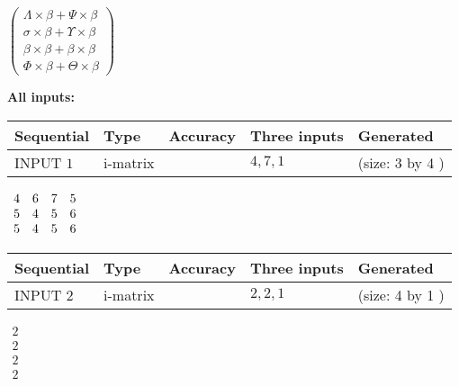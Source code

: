 \documentclass[12pt]{article}
\begin{document}
   
 $  \left( \begin{array}
 {
 c
 }
  \Lambda \times  \beta +  \Psi \times  \beta \\ 
  \sigma \times  \beta +  \Upsilon \times  \beta \\ 
  \beta \times  \beta +  \beta \times  \beta \\ 
  \Phi \times  \beta +  \Theta \times  \beta
 \end{array} \right) $ 
   
   
\noindent\vspace{0.1in}\hspace{-0.08in} {\textbf{\Large{All inputs: }}}
   
   
  
  
\noindent\begin{tabular}{|l|l|l|l|l|}
\hline
 Sequential & Type & Accuracy & Three inputs & Generated \\ 
\hline
 
 
  INPUT $            1 $ & i-matrix &  & $
 4
 , 
 7
 , 
 1
 $ & (size:            3  by            4 )
 \\  \hline  
 \end{tabular}
   
   
 $\begin{array}{
 c
 c
 c
 c
 }
           4  & 
           6  & 
           7  & 
           5  \\ 
           5  & 
           4  & 
           5  & 
           6  \\ 
           5  & 
           4  & 
           5  & 
           6
\end{array}  $ 
  
  
\noindent\begin{tabular}{|l|l|l|l|l|}
\hline
 Sequential & Type & Accuracy & Three inputs & Generated \\ 
\hline
 
 
  INPUT $            2 $ & i-matrix &  & $
 2
 , 
 2
 , 
 1
 $ & (size:            4  by            1 )
 \\  \hline  
 \end{tabular}
   
   
 $\begin{array}{
 c
 }
           2  \\ 
           2  \\ 
           2  \\ 
           2
\end{array}  $ 
  
\end{document}
